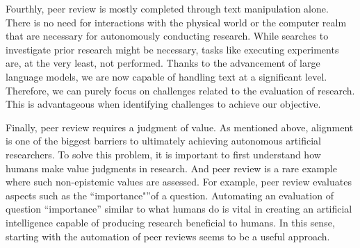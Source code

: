


Fourthly, peer review is mostly completed through text manipulation alone. There is no need for interactions with the physical world or the computer realm that are necessary for autonomously conducting research. While searches to investigate prior research might be necessary, tasks like executing experiments are, at the very least, not performed. Thanks to the advancement of large language models, we are now capable of handling text at a significant level. Therefore, we can purely focus on challenges related to the evaluation of research. This is advantageous when identifying challenges to achieve our objective.


Finally, peer review requires a judgment of value. As mentioned above, alignment is one of the biggest barriers to ultimately achieving autonomous artificial researchers. To solve this problem, it is important to first understand how humans make value judgments in research. And peer review is a rare example where such non-epistemic values are assessed. For example, peer review evaluates aspects such as the ``importance"''of a question. Automating an evaluation of question ``importance'' similar to what humans do is vital in creating an artificial intelligence capable of producing research beneficial to humans. In this sense, starting with the automation of peer reviews seems to be a useful approach.


